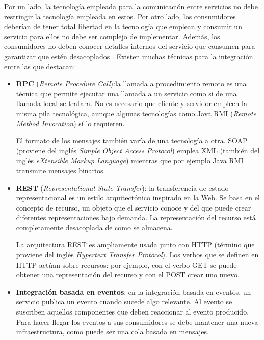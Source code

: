 \documentclass[11pt,spanish,listoffigures]{tfgetsinf}
\begin{document}
Por un lado, la tecnología empleada para la comunicación entre servicios no debe restringir la tecnología empleada en estos. Por otro lado, los consumidores deberían de tener total libertad en la tecnología que emplean y consumir un servicio para ellos no debe ser complejo de implementar. Además, los consumidores no deben conocer detalles internos del servicio que consumen para garantizar que estén desacoplados \cite{Newman2015a}. Existen muchas técnicas para la integración entre las que destacan: 

\begin{itemize}

\item \textbf{RPC} (\textit{Remote Procedure Call}):la llamada a procedimiento remoto es una técnica que permite ejecutar una llamada a un servicio como si de una llamada local se tratara. No es necesario que cliente y servidor empleen la misma pila tecnológica, aunque algunas tecnologías como Java RMI (\textit{Remote Method Invocation}) sí lo requieren. 

El formato de los mensajes también varía de una tecnología a otra. SOAP (proviene del inglés \textit{Simple Object Access Protocol}) emplea XML (también del inglés \textit{eXtensible Markup Language}) mientras que por ejemplo Java RMI transmite mensajes binarios.

\item \textbf{REST} (\textit{Representational State Transfer}): la transferencia de estado representacional es un estilo arquitectónico inspirado en la Web. Se basa en el concepto de recurso, un objeto que el servicio conoce y del que puede crear diferentes representaciones bajo demanda. La representación del recurso está completamente desacoplada de como se almacena.

La arquitectura REST es ampliamente usada junto con HTTP (término que proviene del inglés \textit{Hypertext Transfer Protocol}). Los verbos que se definen en HTTP actúan sobre recursos: por ejemplo, con el verbo GET se puede obtener una representación del recurso y con el POST crear uno nuevo.

\item \textbf{Integración basada en eventos}: en la integración basada en eventos, un servicio publica un evento cuando sucede algo relevante. Al evento se suscriben aquellos componentes que deben reaccionar al evento producido. Para hacer llegar los eventos a sus consumidores se debe mantener una nueva infraestructura, como puede ser una cola basada en mensajes.


\end{itemize}
\end{document}
